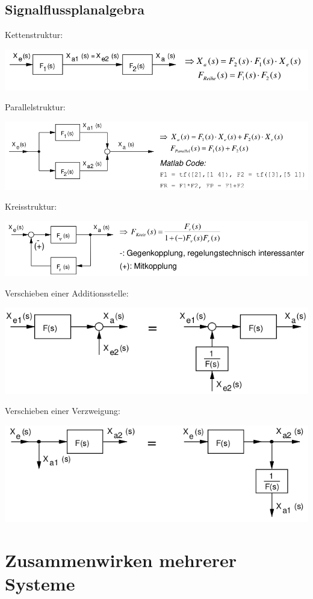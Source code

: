 \documentclass[10pt,a4paper]{article}
\begin{document}
\subsection{Signalflussplanalgebra}
    Kettenstruktur:\\
    \begin{center}
            \includegraphics[width=.45\textwidth]{Figures/Kettenstruktur.png}
    \end{center}
    Parallelstruktur:\\
    \begin{center}
                    \includegraphics[width=.45\textwidth]{Figures/Parallelstruktur.png}
    \end{center}
    Kreisstruktur:\\
    \begin{center}
                    \includegraphics[width=.5\textwidth]{Figures/Kreisstruktur.png}
    \end{center}
    Verschieben einer Additionsstelle:\\
    \begin{center}
                    \includegraphics[width=.45\textwidth]{Figures/Verschiebung einer Additionsstelel.png}
    \end{center}
    Verschieben einer Verzweigung:\\
    \begin{center}
                    \includegraphics[width=.45\textwidth]{Figures/Verschiebung einer Verzweigung.png}
    \end{center}
\section{Zusammenwirken mehrerer Systeme}
\end{document}
